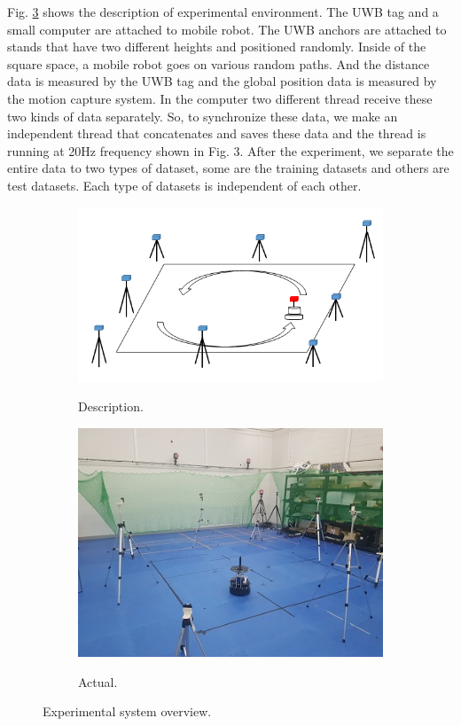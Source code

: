 \documentclass[letterpaper, 10 pt, conference]{ieeeconf}  %
\begin{document}
Fig. \ref{setting} shows the description of experimental environment. The UWB tag and a small computer are attached to mobile robot. The UWB anchors are attached to stands that have two different heights and positioned randomly. Inside of the square space, a mobile robot goes on various random paths. And the distance data is measured by the UWB tag and the global position data is measured by the motion capture system. In the computer two different thread receive these two kinds of data separately. So, to synchronize these data, we make an independent thread that concatenates and saves these data and the thread is running at 20Hz frequency shown in Fig. 3. After the experiment, we separate the entire data to two types of dataset, some are the training datasets and others are test datasets. Each type of datasets is independent of each other.
\begin{figure}[h]
	\centering
	\begin{subfigure}[b]{.25\textwidth}
		\centering
		\includegraphics[width=.9\textwidth]{descriptionSystem}
		\label{setting:sub1} 	
		\caption{Description.}
	\end{subfigure}%
	\begin{subfigure}[b]{.25\textwidth}
		\centering
		\includegraphics[width=.9\textwidth]{actualSystem}
		\label{setting:sub2} 	
		\caption{Actual.}
	\end{subfigure}
	\caption{Experimental system overview.}
	\label{setting}
	
\end{figure}
\end{document}
